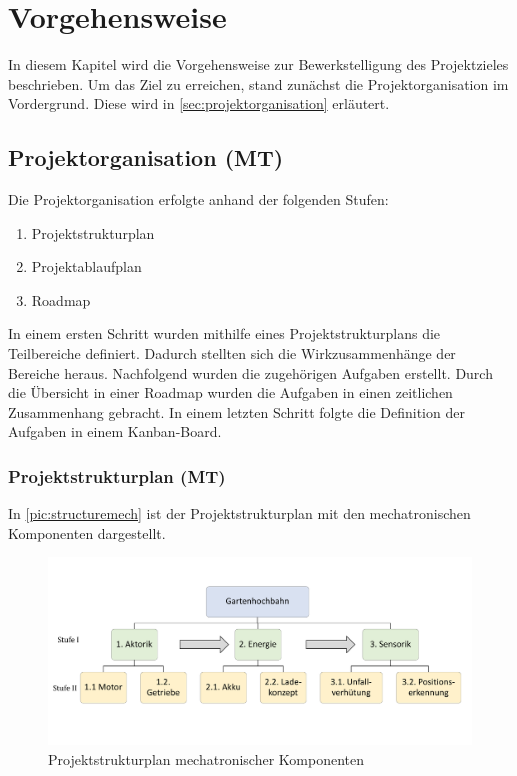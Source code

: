 
\chapter{Vorgehensweise}
\label{cha:vorgehensweise}
In diesem Kapitel wird die Vorgehensweise zur Bewerkstelligung des Projektzieles beschrieben. Um das Ziel zu erreichen, stand zunächst die Projektorganisation im Vordergrund. Diese wird in \autoref{sec:projektorganisation} erläutert. 

\section{Projektorganisation (MT)}
\label{sec:projektorganisation}
Die Projektorganisation erfolgte anhand der folgenden Stufen: 

\begin{enumerate}
	\item Projektstrukturplan %
	\item Projektablaufplan 
	\item Roadmap
	
\end{enumerate}

In einem ersten Schritt wurden mithilfe eines Projektstrukturplans die Teilbereiche definiert. Dadurch stellten sich die Wirkzusammenhänge der Bereiche heraus. Nachfolgend wurden die zugehörigen Aufgaben erstellt. Durch die Übersicht in einer Roadmap wurden die Aufgaben in einen zeitlichen Zusammenhang gebracht. 
In einem letzten Schritt folgte die Definition der Aufgaben in einem Kanban-Board. 


\newpage
\subsection{Projektstrukturplan (MT)}
In \autoref{pic:structuremech} ist der  Projektstrukturplan mit den mechatronischen Komponenten dargestellt. 

\begin{figure}[h]
	\begin{center}
		\includegraphics[width=17cm]{projektstrukturplan.pdf}
		\caption{Projektstrukturplan mechatronischer Komponenten}
		\label{pic:structuremech}
	\end{center}
\end{figure}

